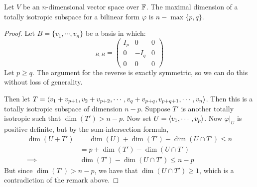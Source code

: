 \documentclass[../Main.tex]{subfiles}
\begin{document}
\begin{proposition}
    Let $V$ be an $n$-dimensional vector space over $\mathbb{F}$. The maximal dimension of a totally isotropic subspace for a bilinear form $\varphi$ is $n - \max\{p, q\}$.
    \label{propTISMaxDim}
\end{proposition}
\begin{proof}
    Let $B = \{v_1, \cdots, v_n\}$ be a basis in which:
    \begin{equation*}
        [\varphi]_{B, B} =
        \begin{pmatrix}
            I_p & 0 & 0 \\
            0 & -I_q & 0 \\
            0 & 0 & 0
        \end{pmatrix}
    \end{equation*}
    Let $p \geq q$. The argument for the reverse is exactly symmetric, so we can do this without loss of generality.

    Then let $T = \left\langle v_1 + v_{p + 1}, v_2 + v_{p + 2}, \cdots, v_q + v_{p + q}, v_{p + q + 1}, \cdots, v_n \right\rangle$.
    Then this is a totally isotropic subspace of dimension $n - p$. Suppose $T'$ is another totally isotropic such that $\dim(T') > n - p$. Now set $U = \left\langle v_1, \cdots, v_p \right\rangle$. Now $\varphi |_U$ is positive definite, but by the sum-intersection formula,
    \begin{align*}
        \dim(U + T') &= \dim(U) + \dim(T') - \dim(U \cap T') \leq n \\
        &= p + \dim(T') - \dim(U \cap T') \\
        \implies &\dim(T') - \dim(U \cap T') \leq n - p
    \end{align*}
    But since $\dim(T') > n - p$, we have that $\dim(U \cap T') \geq 1$, which is a contradiction of the remark above.
\end{proof}
\end{document}
